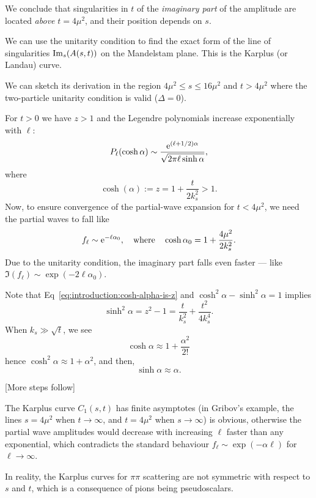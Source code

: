 \M[-1]
We conclude that singularities in $t$ of the \emph{imaginary part} of
the amplitude are located \emph{above} $t=4\mu^{2}$, and their position
depends on $s$.

We can use the unitarity condition to find the exact form of the line of
singularities $\operatorname{Im}_{s}(A(s,t))$ on the Mandelstam plane. This
is the Karplus (or Landau) curve.

 We can sketch its derivation in the region
$4\mu^{2}\leq s\leq 16\mu^{2}$ and $t>4\mu^{2}$ where the two-particle
unitarity condition is valid ($\Delta=0$).

For $t>0$ we have $z>1$ and the Legendre polynomials increase
exponentially with $\ell$:
\begin{equation}
P_{\ell}(\cosh\alpha)\sim\frac{\mathrm{e}^{(\ell + 1/2)\alpha}}{\sqrt{2\pi\ell\sinh\alpha}},
\end{equation}
where
\begin{equation}\label{eq:introduction:cosh-alpha-is-z}
\cosh(\alpha):=z=1 + \frac{t}{2k_{s}^{2}}>1.
\end{equation}
Now, to ensure convergence of the partial-wave expansion for
$t<4\mu^{2}$, we need the partial waves to fall like
\begin{equation}\label{eq:introduction:asymptotic-t-behaviour-karplus-curve-example}
f_{\ell}\sim\mathrm{e}^{-\ell\alpha_{0}},\quad\mbox{where}\quad\cosh\alpha_{0}=1+\frac{4\mu^{2}}{2k_{s}^{2}}.
\end{equation}
Due to the unitarity condition, the imaginary part falls even faster ---
like $\Im(f_{\ell})\sim\exp(-2\ell\alpha_{0})$.

\M[1]
Note that Eq~\eqref{eq:introduction:cosh-alpha-is-z} and
$\cosh^{2}\alpha-\sinh^{2}\alpha=1$ implies
\begin{equation}
\sinh^{2}\alpha = z^{2} - 1 = \frac{t}{k_{s}^{2}} + \frac{t^{2}}{4k_{s}^{4}}.
\end{equation}
When $k_{s}\gg\sqrt{t}$, we see
\begin{equation}
\cosh\alpha\approx 1 + \frac{\alpha^{2}}{2!}
\end{equation}
hence $\cosh^{2}\alpha\approx 1 + \alpha^{2}$, and then,
\begin{equation}
\sinh\alpha \approx \alpha.
\end{equation}

\M[-1]{} [More steps follow]

\M The Karplus curve $C_{1}(s,t)$ has finite asymptotes (in Gribov's
example, the lines $s=4\mu^{2}$ when $t\to\infty$, and $t=4\mu^{2}$ when $s\to\infty$)
is obvious, otherwise the partial wave amplitudes would decrease with
increasing $\ell$ faster than any exponential, which contradicts the
standard behaviour $f_{\ell}\sim\exp(-\alpha\ell)$ for $\ell\to\infty$.

In reality, the Karplus curves for $\pi\pi$ scattering are not symmetric
with respect to $s$ and $t$, which is a consequence of pions being
pseudoscalars. 


